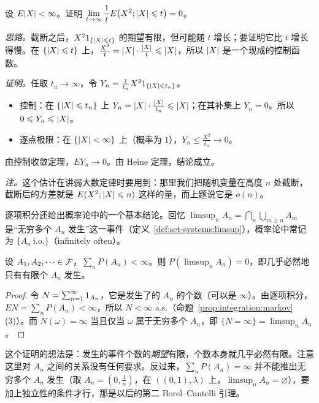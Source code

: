 \begin{workedexample}\label{we:expectation:truncated-second-moment}
设 $E\lvert X\rvert<\infty$。证明 $\displaystyle\lim_{t\to\infty}\frac1tE\bigl(X^2;\lvert X\rvert\leqslant t\bigr)=0$。
\end{workedexample}
\begin{solution}
\emph{思路。}截断之后，$X^21_{\{\lvert X\rvert\leqslant t\}}$ 的期望有限，但可能随 $t$ 增长；要证明它比 $t$ 增长得慢。在 $\{\lvert X\rvert\leqslant t\}$ 上，$\frac{X^2}t=\lvert X\rvert\cdot\frac{\lvert X\rvert}t\leqslant\lvert X\rvert$，所以 $\lvert X\rvert$ 是一个现成的控制函数。

\emph{证明。}任取 $t_n\to\infty$，令 $Y_n=\frac1{t_n}X^21_{\{\lvert X\rvert\leqslant t_n\}}$。
\begin{itemize}
\item 控制：在 $\{\lvert X\rvert\leqslant t_n\}$ 上 $Y_n=\lvert X\rvert\cdot\frac{\lvert X\rvert}{t_n}\leqslant\lvert X\rvert$；在其补集上 $Y_n=0$。所以 $0\leqslant Y_n\leqslant\lvert X\rvert$。
\item 逐点极限：在 $\{\lvert X\rvert<\infty\}$ 上（概率为 $1$），$Y_n\leqslant\frac{X^2}{t_n}\to0$。
\end{itemize}
由控制收敛定理，$EY_n\to0$。由 Heine 定理，结论成立。

\emph{注。}这个估计在讲弱大数定律时要用到：那里我们把随机变量在高度 $n$ 处截断，截断后的方差就是 $E(X^2;\lvert X\rvert\leqslant n)$ 这样的量，而上题说它是 $o(n)$。
\end{solution}


逐项积分还给出概率论中的一个基本结论。回忆 $\limsup_nA_n=\bigcap_n\bigcup_{m\geqslant n}A_m$ 是“无穷多个 $A_n$ 发生”这一事件（定义~\ref{def:set-systems:limsup}），概率论中常记为 $\{A_n\ \text{i.o.}\}$（infinitely often）。

\begin{theorem}\label{thm:expectation:borel-cantelli}
设 $A_1,A_2,\dots\in\mathcal{F}$，$\sum_nP(A_n)<\infty$。则 $P(\limsup_nA_n)=0$，即几乎必然地只有有限个 $A_n$ 发生。
\end{theorem}
\begin{proof}
令 $N=\sum_{n=1}^\infty1_{A_n}$，它是发生了的 $A_n$ 的个数（可以是 $\infty$）。由逐项积分，$EN=\sum_nP(A_n)<\infty$，所以 $N<\infty$ a.s.（命题~\ref{prop:integration:markov}(3)）。而 $N(\omega)=\infty$ 当且仅当 $\omega$ 属于无穷多个 $A_n$，即 $\{N=\infty\}=\limsup_nA_n$。
\end{proof}

这个证明的想法是：发生的事件个数的\emph{期望}有限，个数本身就几乎必然有限。注意这里对 $A_n$ 之间的关系没有任何要求。反过来，$\sum_nP(A_n)=\infty$ 并不能推出无穷多个 $A_n$ 发生（取 $A_n=(0,\frac1n)$，在 $((0,1),\lambda)$ 上，$\limsup_nA_n=\varnothing$），要加上独立性的条件才行，那是以后的第二 Borel--Cantelli 引理。

